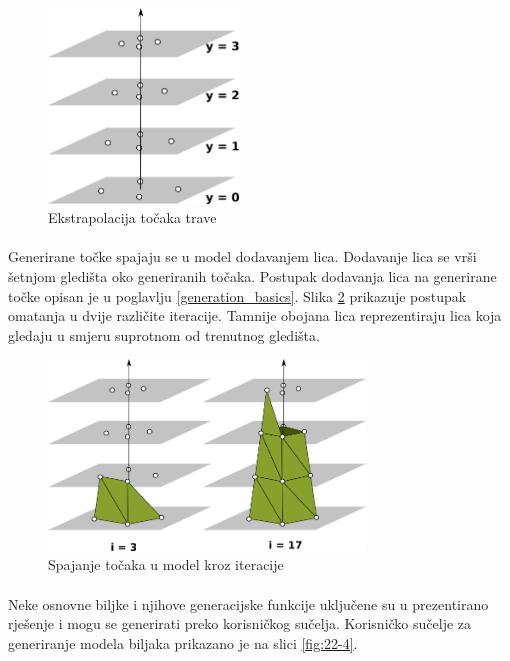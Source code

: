 \documentclass[times, utf8, diplomski]{fer}
\begin{document}
\begin{figure}[h]
	\centering
	\includegraphics[width=0.45\textwidth]{img/22-2}
	\caption{Ekstrapolacija točaka trave}
	\label{fig:22-2}
\end{figure}

\paragraph{}
Generirane točke spajaju se u model dodavanjem lica. Dodavanje lica se vrši šetnjom gledišta oko generiranih točaka. Postupak dodavanja lica na generirane točke opisan je u poglavlju \ref{generation_basics}. Slika \ref{fig:22-3} prikazuje postupak omatanja u dvije različite iteracije. Tamnije obojana lica reprezentiraju lica koja gledaju u smjeru suprotnom od trenutnog gledišta.

\begin{figure}[h]
	\centering
	\includegraphics[width=0.75\textwidth]{img/22-3}
	\caption{Spajanje točaka u model kroz iteracije}
	\label{fig:22-3}
\end{figure}

\paragraph{}
Neke osnovne biljke i njihove generacijske funkcije uključene su u prezentirano rješenje i 
mogu se generirati preko korisničkog sučelja. Korisničko sučelje za generiranje modela 
biljaka prikazano je na slici \ref{fig:22-4}.
\end{document}
